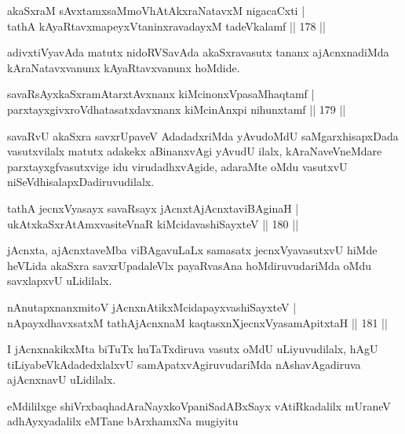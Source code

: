 \begin{shl}
akaSxraM sAvxtamxsaMmoVhAtAkxraNatavxM nigacaCxti |\\
tathA kAyaRtavxmapeyxVtaninxravadayxM tadeVkalamf \hfill || 178 ||
\end{shl}

\begin{artha}
adivxtiVyavAda matutx nidoRVSavAda akaSxravasutx tananx ajAcnxnadiMda kAraNatavxvanunx kAyaRtavxvanunx hoMdide.
\end{artha}

\begin{shl}
savaRsAyxkaSxramAtarxtAvxnanx kiMcinonxVpasaMhaqtamf |\\
parxtayxgivxroVdhatasatxdavxnanx kiMcinAnxpi nihunxtamf \hfill || 179 ||
\end{shl}

\begin{artha}
savaRvU akaSxra savxrUpaveV AdadadxriMda yAvudoMdU saMgarxhisapxDada vasutxvilalx matutx adakekx aBinanxvAgi yAvudU ilalx, kAraNaveVneMdare parxtayxgfvasutxvige idu virudadhxvAgide, adaraMte oMdu vasutxvU niSeVdhisalapxDadiruvudilalx.
\end{artha}%

\begin{shl}
tathA jecnxVyasayx savaRsayx jAcnxtAjAcnxtaviBAginaH |\\
ukAtxkaSxrAtAmxvasiteVnaR kiMcidavashiSayxteV \hfill || 180 ||
\end{shl}

\begin{artha}
jAcnxta, ajAcnxtaveMba viBAgavuLaLx samasatx jecnxVyavasutxvU hiMde heVLida akaSxra savxrUpadaleVlx payaRvasAna hoMdiruvudariMda oMdu savxlapxvU uLidilalx.
\end{artha}

\begin{shl}
nAnutapxnanxmitoV jAcnxnAtikxMcidapayxvashiSayxteV |\\
nApayxdhavxsatxM tathA\s jAcnxnaM kaqtasxnXjecnxVyasamApitxtaH \hfill || 181 ||
\end{shl}

\begin{artha}
I jAcnxnakikxMta biTuTx huTaTxdiruva vasutx oMdU uLiyuvudilalx, hAgU tiLiyabeVkAdadedxlalxvU samApatxvAgiruvudariMda nAshavAgadiruva ajAcnxnavU uLidilalx.
\end{artha}

\begin{center}
eMdililxge shiVrxbaqhadAraNayxkoVpaniSadABxSayx vAtiRkadalilx mUraneV adhAyxyadalilx eMTane bArxhamxNa mugiyitu
\end{center}
